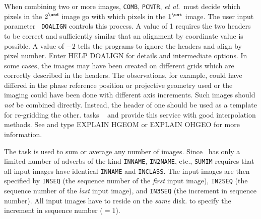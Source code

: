      When combining two or more images, {\tt COMB}, {\tt PCNTR}, {\it
et al.}~must decide which pixels in the $2^{\und}$ image go with which
pixels in the $1^{\ust}$ image.  The user input parameter {\tt
DOALIGN} controls this process.  A value of 1 requires the two headers
to be correct and sufficiently similar that an alignment by coordinate
value is possible.  A value of $-2$ tells the programs to ignore the
headers and align by pixel number.  Enter {\us HELP DOALIGN \CR} for
details and intermediate options.  In some cases, the images may have
been created on different grids which are correctly described in the
headers.  The observations, for example, could have differed in the
phase reference position or projective geometry used or the imaging
could have been done with different axis increments.  Such images
should {\it not\/} be combined directly.  Instead, the header of one
should be used as a template for re-gridding the other.  tasks {\tt
{}} and {\tt {}} provide this service with good
interpolation methods. See  and type {\us EXPLAIN HGEOM
\CR} or {\us EXPLAIN OHGEO \CR} for more information.


The task {\tt {}} is used to sum or average any number of
images. Since \AIPS\ has only a limited number of adverbs of the kind
{\tt INNAME}, {\tt IN2NAME}, etc., {\tt SUMIM} requires that all input
images have identical {\tt INNAME} and \hbox{{\tt INCLASS}}. The input
images are then specified by {\tt INSEQ} (the sequence number of the
{\it first\/} input image), {\tt IN2SEQ} (the sequence number of the
{\it last\/} input image), and {\tt IN3SEQ} (the increment in sequence
number). All input images have to reside on the {\it same\/} disk.
 {to specify the increment in sequence number
            ($=1$).}

